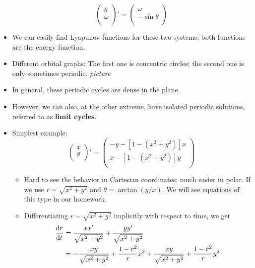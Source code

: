 \documentclass[../notes.tex]{subfiles}
\begin{document}
\begin{itemize}
    \begin{equation*}
        \begin{pmatrix}
            \theta\\
            \omega\\
        \end{pmatrix}'
        =
        \begin{pmatrix}
            \omega\\
            -\sin\theta\\
        \end{pmatrix}
    \end{equation*}
    \item We can easily find Lyapunov functions for these two systems; both functions are the energy function.
    \item Different orbital graphs: The first one is concentric circles; the second one is only sometimes periodic.
    \emph{picture}
    \item In general, these periodic cycles are dense in the plane.
    \item However, we can also, at the other extreme, have isolated periodic solutions, referred to as \textbf{limit cycles}.
    \item Simplest example:
    \begin{equation*}
        \begin{pmatrix}
            x\\
            y\\
        \end{pmatrix}'
        =
        \begin{pmatrix}
            -y-[1-(x^2+y^2)]x\\
            x-[1-(x^2+y^2)]y\\
        \end{pmatrix}
    \end{equation*}
    \begin{itemize}
        \item Hard to see the behavior in Cartesian coordinates; much easier in polar. If we use $r=\sqrt{x^2+y^2}$ and $\theta=\arctan(y/x)$. We will see equations of this type in our homework.
        \item Differentiating $r=\sqrt{x^2+y^2}$ implicitly with respect to time, we get
        \begin{align*}
            \dv{r}{t} &= \frac{xx'}{\sqrt{x^2+y^2}}+\frac{yy'}{\sqrt{x^2+y^2}}\\
            &= -\frac{xy}{\sqrt{x^2+y^2}}+\frac{1-r^2}{r}x^2+\frac{xy}{\sqrt{x^2+y^2}}+\frac{1-r^2}{r}y^2\\

\end{align*}
\end{itemize}
\end{itemize}
\end{document}
